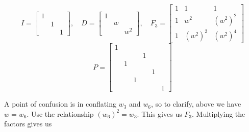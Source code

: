 \documentclass[a4paper]{article}
\begin{document}
\[
	I = \begin{bmatrix}
		1 &  & \\
		 & 1 & \\
		 &  & 1
	\end{bmatrix}, \quad
	D = \begin{bmatrix}
		1 &  & \\
		 & w & \\
		 &  & w^{2}
	\end{bmatrix}, \quad
	F_{3} = \begin{bmatrix}
		1 & 1 & 1 \\
		1 & w^{2} & \!\left( w^{2} \right)^{2} \\
		1 & \!\left( w^{2} \right)^{2} & \!\left( w^{2} \right)^{4}
	\end{bmatrix}
\]
\[
	P = \begin{bmatrix}
		1 &  &  &  &  & \\
		 &  &  & 1 &  & \\
		 & 1 &  &  &  & \\
		 &  &  &  & 1 & \\
		 &  & 1 &  &  & \\
		 &  &  &  &  & 1
	\end{bmatrix}
\]

A point of confusion is in conflating \( w_{3} \) and \( w_{6} \), so to clarify, above we have \( w = w_{6} \). Use the relationship \( \!\left( w_{6} \right)^{2} = w_{3} \). This gives us \( F_{3} \). Multiplying the factors gives us 
\end{document}
